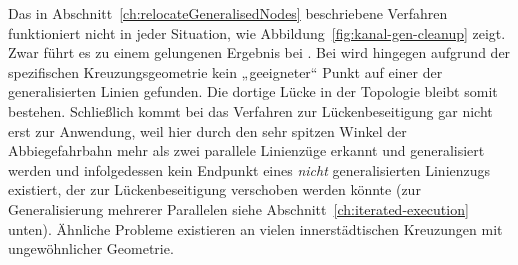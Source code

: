 \documentclass[../main/thesis.tex]{subfiles}
\begin{document}

Das in Abschnitt~\ref{ch:relocateGeneralisedNodes} beschriebene Verfahren funktioniert nicht in jeder Situation, wie Abbildung~\ref{fig:kanal-gen-cleanup} zeigt.
Zwar führt es zu einem gelungenen Ergebnis bei .
Bei  wird hingegen aufgrund der spezifischen Kreuzungsgeometrie kein „geeigneter“ Punkt auf einer der generalisierten Linien gefunden.
Die dortige Lücke in der Topologie bleibt somit bestehen.
Schließlich kommt bei  das Verfahren zur Lückenbeseitigung gar nicht erst zur Anwendung, weil hier durch den sehr spitzen Winkel der Abbiegefahrbahn mehr als zwei parallele Linienzüge erkannt und generalisiert werden und infolgedessen kein Endpunkt eines \emph{nicht} generalisierten Linienzugs existiert, der zur Lückenbeseitigung verschoben werden könnte (zur Generalisierung mehrerer Parallelen siehe Abschnitt~\ref{ch:iterated-execution} unten).
Ähnliche Probleme existieren an vielen innerstädtischen Kreuzungen mit ungewöhnlicher Geometrie.
\end{document}
